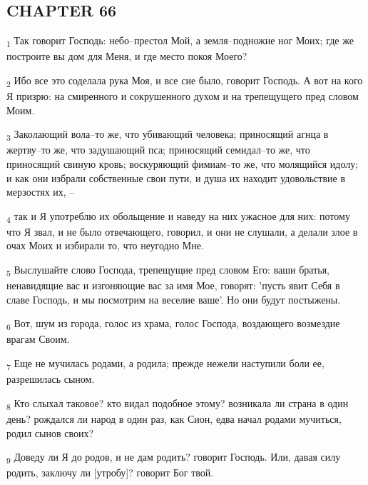 \subsection{CHAPTER 66}
\begin{tcolorbox}
\textsubscript{1} Так говорит Господь: небо--престол Мой, а земля--подножие ног Моих; где же построите вы дом для Меня, и где место покоя Моего?
\end{tcolorbox}
\begin{tcolorbox}
\textsubscript{2} Ибо все это соделала рука Моя, и все сие было, говорит Господь. А вот на кого Я призрю: на смиренного и сокрушенного духом и на трепещущего пред словом Моим.
\end{tcolorbox}
\begin{tcolorbox}
\textsubscript{3} Заколающий вола--то же, что убивающий человека; приносящий агнца в жертву--то же, что задушающий пса; приносящий семидал--то же, что приносящий свиную кровь; воскуряющий фимиам--то же, что молящийся идолу; и как они избрали собственные свои пути, и душа их находит удовольствие в мерзостях их, --
\end{tcolorbox}
\begin{tcolorbox}
\textsubscript{4} так и Я употреблю их обольщение и наведу на них ужасное для них: потому что Я звал, и не было отвечающего, говорил, и они не слушали, а делали злое в очах Моих и избирали то, что неугодно Мне.
\end{tcolorbox}
\begin{tcolorbox}
\textsubscript{5} Выслушайте слово Господа, трепещущие пред словом Его: ваши братья, ненавидящие вас и изгоняющие вас за имя Мое, говорят: 'пусть явит Себя в славе Господь, и мы посмотрим на веселие ваше'. Но они будут постыжены.
\end{tcolorbox}
\begin{tcolorbox}
\textsubscript{6} Вот, шум из города, голос из храма, голос Господа, воздающего возмездие врагам Своим.
\end{tcolorbox}
\begin{tcolorbox}
\textsubscript{7} Еще не мучилась родами, а родила; прежде нежели наступили боли ее, разрешилась сыном.
\end{tcolorbox}
\begin{tcolorbox}
\textsubscript{8} Кто слыхал таковое? кто видал подобное этому? возникала ли страна в один день? рождался ли народ в один раз, как Сион, едва начал родами мучиться, родил сынов своих?
\end{tcolorbox}
\begin{tcolorbox}
\textsubscript{9} Доведу ли Я до родов, и не дам родить? говорит Господь. Или, давая силу родить, заключу ли [утробу]? говорит Бог твой.
\end{tcolorbox}
